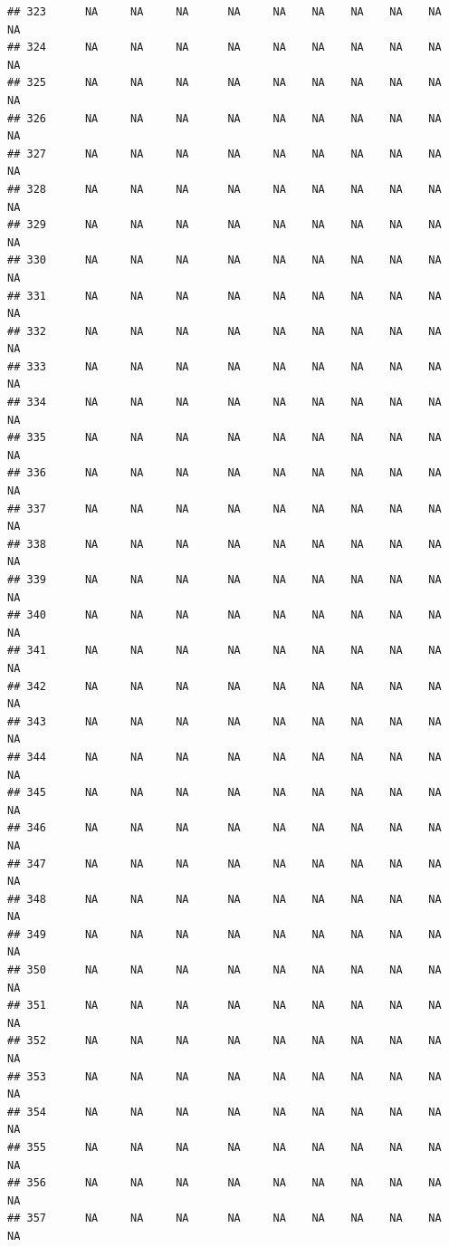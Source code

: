 \documentclass{article}\usepackage{graphicx, color}
\makeatletter
\newenvironment{kframe}{%
 \def\at@end@of@kframe{}%
 \ifinner\ifhmode%
  \def\at@end@of@kframe{\end{minipage}}%
  \begin{minipage}{\columnwidth}%
 \fi\fi%
 \def\FrameCommand##1{\hskip\@totalleftmargin \hskip-\fboxsep
 \colorbox{shadecolor}{##1}\hskip-\fboxsep
     \hskip-\linewidth \hskip-\@totalleftmargin \hskip\columnwidth}%
 \MakeFramed {\advance\hsize-\width
   \@totalleftmargin\z@ \linewidth\hsize
   \@setminipage}}%
 {\par\unskip\endMakeFramed%
 \at@end@of@kframe}
\newenvironment{knitrout}{}{} %
\makeatother
\begin{document}
\begin{knitrout}
\begin{kframe}
\begin{verbatim}
## 323      NA     NA     NA      NA     NA    NA    NA    NA    NA     NA
## 324      NA     NA     NA      NA     NA    NA    NA    NA    NA     NA
## 325      NA     NA     NA      NA     NA    NA    NA    NA    NA     NA
## 326      NA     NA     NA      NA     NA    NA    NA    NA    NA     NA
## 327      NA     NA     NA      NA     NA    NA    NA    NA    NA     NA
## 328      NA     NA     NA      NA     NA    NA    NA    NA    NA     NA
## 329      NA     NA     NA      NA     NA    NA    NA    NA    NA     NA
## 330      NA     NA     NA      NA     NA    NA    NA    NA    NA     NA
## 331      NA     NA     NA      NA     NA    NA    NA    NA    NA     NA
## 332      NA     NA     NA      NA     NA    NA    NA    NA    NA     NA
## 333      NA     NA     NA      NA     NA    NA    NA    NA    NA     NA
## 334      NA     NA     NA      NA     NA    NA    NA    NA    NA     NA
## 335      NA     NA     NA      NA     NA    NA    NA    NA    NA     NA
## 336      NA     NA     NA      NA     NA    NA    NA    NA    NA     NA
## 337      NA     NA     NA      NA     NA    NA    NA    NA    NA     NA
## 338      NA     NA     NA      NA     NA    NA    NA    NA    NA     NA
## 339      NA     NA     NA      NA     NA    NA    NA    NA    NA     NA
## 340      NA     NA     NA      NA     NA    NA    NA    NA    NA     NA
## 341      NA     NA     NA      NA     NA    NA    NA    NA    NA     NA
## 342      NA     NA     NA      NA     NA    NA    NA    NA    NA     NA
## 343      NA     NA     NA      NA     NA    NA    NA    NA    NA     NA
## 344      NA     NA     NA      NA     NA    NA    NA    NA    NA     NA
## 345      NA     NA     NA      NA     NA    NA    NA    NA    NA     NA
## 346      NA     NA     NA      NA     NA    NA    NA    NA    NA     NA
## 347      NA     NA     NA      NA     NA    NA    NA    NA    NA     NA
## 348      NA     NA     NA      NA     NA    NA    NA    NA    NA     NA
## 349      NA     NA     NA      NA     NA    NA    NA    NA    NA     NA
## 350      NA     NA     NA      NA     NA    NA    NA    NA    NA     NA
## 351      NA     NA     NA      NA     NA    NA    NA    NA    NA     NA
## 352      NA     NA     NA      NA     NA    NA    NA    NA    NA     NA
## 353      NA     NA     NA      NA     NA    NA    NA    NA    NA     NA
## 354      NA     NA     NA      NA     NA    NA    NA    NA    NA     NA
## 355      NA     NA     NA      NA     NA    NA    NA    NA    NA     NA
## 356      NA     NA     NA      NA     NA    NA    NA    NA    NA     NA
## 357      NA     NA     NA      NA     NA    NA    NA    NA    NA     NA

\end{verbatim}
\end{kframe}
\end{knitrout}
\end{document}

